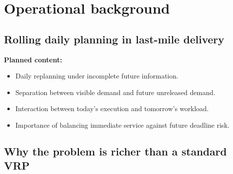 \section{Operational background}
\label{sec:chapter03_operational_background}

%

\subsection{Rolling daily planning in last-mile delivery}
\label{subsec:chapter03_rolling_daily_planning}

%

\noindent\textbf{Planned content:}
\begin{itemize}
    \item Daily replanning under incomplete future information.
    \item Separation between visible demand and future unreleased demand.
    \item Interaction between today's execution and tomorrow's workload.
    \item Importance of balancing immediate service against future deadline risk.
\end{itemize}

\subsection{Why the problem is richer than a standard VRP}
\label{subsec:chapter03_richer_than_standard_vrp}

%

